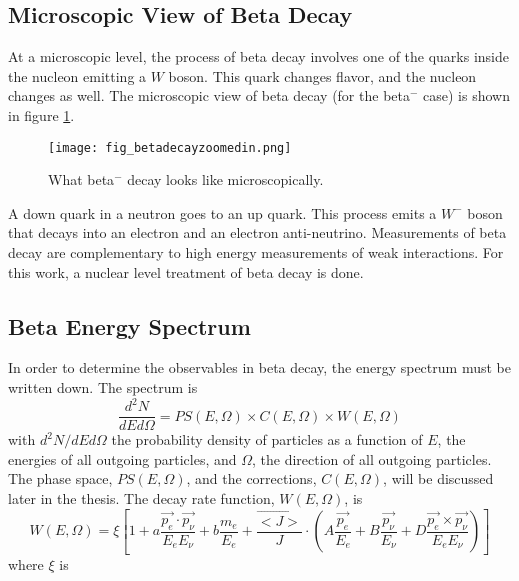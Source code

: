 \documentclass[../MaxHughesThesis.tex]{subfiles}
\begin{document}
\subsection{Microscopic View of Beta Decay}
At a microscopic level, the process of beta decay involves one of the quarks inside the nucleon emitting a $W$ boson. 
This quark changes flavor, and the nucleon changes as well. 
The microscopic view of beta decay (for the beta$^{-}$ case) is shown in figure \ref{fig:betadecaymicro}.

\begin{figure}[!htb]
	\centerline{\texttt{[image: fig\_betadecayzoomedin.png]}}
	\caption{What beta$^{-}$ decay looks like microscopically.}
	\label{fig:betadecaymicro}
\end{figure}
A down quark in a neutron goes to an up quark.
This process emits a $W^{-}$ boson that decays into an electron and an electron anti-neutrino.
Measurements of beta decay are complementary to high energy measurements of weak interactions.
For this work, a nuclear level treatment of beta decay is done.  

\subsection{Beta Energy Spectrum}
In order to determine the observables in beta decay, the energy spectrum must be written down. 
The spectrum is %
\begin{equation}
	\frac{d^{2}N}{dE d\Omega} = PS(E,\Omega) \times C(E, \Omega) \times W(E, \Omega)  
	\label{eq:betaenspectrum}
\end{equation}
with $d^{2}N/dE d\Omega$ the probability density of particles as a function of $E$, the energies of all outgoing particles, and $\Omega$, the direction of all outgoing particles.
The phase space, $PS(E,\Omega)$, and the corrections, $C(E,\Omega)$, will be discussed later in the thesis. 
The decay rate function, $W(E,\Omega)$, is \cite{Jack57} %
\begin{equation}
	 W(E,\Omega) = \xi [1 + a \frac{\vec{p_{e}} \cdot \vec{p_{\nu}}} {E_{e} E_{\nu}}  +  b \frac{m_{e}}{E_{e}} + \frac{\vec{<J>}}{J} \cdot (A \frac{ \vec{p_{e}} }{E_{e}} + B \frac{\vec{p_{\nu}}}{E_{\nu}} + D \frac{\vec{p_{e}} \times \vec{p_{\nu}}}{E_{e} E_{\nu}})]
	\label{eq:matrixelement}
\end{equation}
where $\xi$ is 
 
\end{document}

